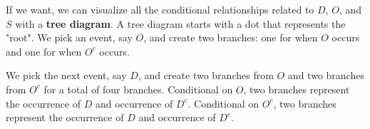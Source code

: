 If we want, we can visualize all the conditional relationships related to $D$, $O$, and $S$ with a \textbf{tree diagram}.
A tree diagram starts with a dot that represents the "root". 
We pick an event, say $O$, and create two branches: one for when $O$ occurs and one for when $O^{c}$ occurs. 

\begin{figure}
    \centering
    \caption{ }
\end{figure}

We pick the next event, say $D$, and create two branches from $O$ and two branches from $O^{c}$ for a total of four branches. 
Conditional on  $O$, two branches represent the occurrence of $D$ and occurrence of $D^{c}$.
Conditional on $O^{c}$, two branches represent the occurrence of $D$ and occurrence of $D^{c}$. 


